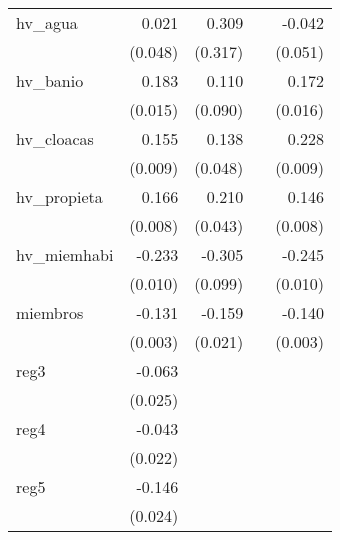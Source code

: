{\begin{longtable}{l*{4}{D{.}{.}{-1}}}
\addlinespace
hv\_agua     &       0.021         &       0.309         &                     &      -0.042         \\
            &     (0.048)         &     (0.317)         &                     &     (0.051)         \\
\addlinespace
hv\_banio    &       0.183\sym{***}&       0.110         &                     &       0.172\sym{***}\\
            &     (0.015)         &     (0.090)         &                     &     (0.016)         \\
\addlinespace
hv\_cloacas  &       0.155\sym{***}&       0.138\sym{**} &                     &       0.228\sym{***}\\
            &     (0.009)         &     (0.048)         &                     &     (0.009)         \\
\addlinespace
hv\_propieta &       0.166\sym{***}&       0.210\sym{***}&                     &       0.146\sym{***}\\
            &     (0.008)         &     (0.043)         &                     &     (0.008)         \\
\addlinespace
hv\_miemhabi &      -0.233\sym{***}&      -0.305\sym{**} &                     &      -0.245\sym{***}\\
            &     (0.010)         &     (0.099)         &                     &     (0.010)         \\
\addlinespace
miembros    &      -0.131\sym{***}&      -0.159\sym{***}&                     &      -0.140\sym{***}\\
            &     (0.003)         &     (0.021)         &                     &     (0.003)         \\
\addlinespace
reg3        &      -0.063\sym{*}  &                     &                     &                     \\
            &     (0.025)         &                     &                     &                     \\
\addlinespace
reg4        &      -0.043         &                     &                     &                     \\
            &     (0.022)         &                     &                     &                     \\
\addlinespace
reg5        &      -0.146\sym{***}&                     &                     &                     \\
            &     (0.024)         &                     &                     &                     \\

\end{longtable}}
